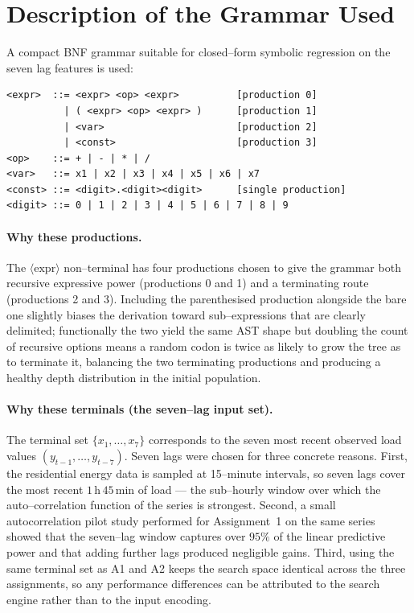 \documentclass[12pt,a4paper]{article}
\begin{document}
\section{Description of the Grammar Used}

A compact BNF grammar suitable for closed--form symbolic regression on
the seven lag features is used:
\begin{lstlisting}
<expr>  ::= <expr> <op> <expr>          [production 0]
          | ( <expr> <op> <expr> )      [production 1]
          | <var>                       [production 2]
          | <const>                     [production 3]
<op>    ::= + | - | * | /
<var>   ::= x1 | x2 | x3 | x4 | x5 | x6 | x7
<const> ::= <digit>.<digit><digit>      [single production]
<digit> ::= 0 | 1 | 2 | 3 | 4 | 5 | 6 | 7 | 8 | 9
\end{lstlisting}

\paragraph{Why these productions.} The $\langle\text{expr}\rangle$
non--terminal has four productions chosen to give the grammar both
recursive expressive power (productions 0 and 1) and a terminating route
(productions 2 and 3). Including the parenthesised production alongside
the bare one slightly biases the derivation toward sub--expressions
that are clearly delimited; functionally the two yield the same AST
shape but doubling the count of recursive options means a random codon
is twice as likely to grow the tree as to terminate it, balancing the
two terminating productions and producing a healthy depth distribution
in the initial population.

\paragraph{Why these terminals (the seven--lag input set).}
The terminal set $\{x_1,\ldots,x_7\}$ corresponds to the seven most
recent observed load values $(y_{t-1},\ldots,y_{t-7})$. Seven lags
were chosen for three concrete reasons. First, the residential energy
data is sampled at 15--minute intervals, so seven lags cover the most
recent $1\,\text{h}\,45\,\text{min}$ of load --- the sub--hourly window
over which the auto--correlation function of the series is strongest.
Second, a small autocorrelation pilot study performed for Assignment~1
on the same series showed that the seven--lag window captures over
$95\%$ of the linear predictive power and that adding further lags
produced negligible gains. Third, using the same terminal set as A1 and
A2 keeps the search space identical across the three assignments, so any
performance differences can be attributed to the search engine rather
than to the input encoding.
\end{document}
